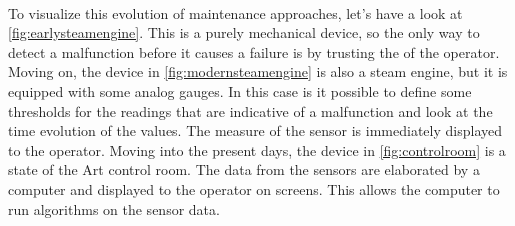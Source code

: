 \paragraph*{}
To visualize this evolution of maintenance approaches, let's have a look at \autoref{fig:earlysteamengine}. This is a purely mechanical device, so the only way to detect a malfunction before it causes a failure is by trusting the  of the operator. Moving on, the device in \autoref{fig:modernsteamengine} is also a steam engine, but it is equipped with some analog gauges. In this case is it possible to define some thresholds for the readings that are indicative of a malfunction and look at the time evolution of the values. The measure of the sensor is immediately displayed to the operator. Moving into the present days, the device in \autoref{fig:controlroom} is a state of the Art control room. The data from the sensors are elaborated by a computer and displayed to the operator on screens. This allows the computer to run algorithms on the sensor data.

